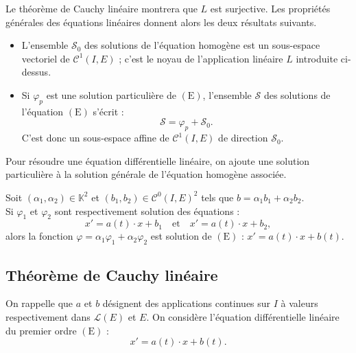\documentclass[french]{article}
\newcommand{\K}{\mathbb{K}}
\theoremstyle{plain}
\theoremstyle{definition}
\theoremstyle{remark}
\begin{document}
Le théorème de Cauchy linéaire montrera que $L$ est surjective. Les propriétés générales des équations linéaires donnent alors les deux résultats suivants.

\begin{prop}%
	\begin{itemize}
		\item L'ensemble $\mathcal{S}_0$ des solutions de l'équation homogène est un sous-espace vectoriel de $\mathcal{C}^1(I,E)$ ; c'est le noyau de l'application linéaire $L$ introduite ci-dessus.
		\item Si $\varphi_p$ est une solution particulière de $(\text{E})$, l'ensemble $\mathcal{S}$ des solutions de l'équation $(\text{E})$ s'écrit :
		$$\mathcal{S}=\varphi_p+\mathcal{S}_0.$$
		C'est donc un sous-espace affine de $\mathcal{C}^1(I,E)$ de direction $\mathcal{S}_0$.
	\end{itemize}
\end{prop}

\begin{met}
	Pour résoudre une équation différentielle linéaire, on ajoute une solution particulière à la solution générale de l'équation homogène associée.
\end{met}

\begin{prop}%
	Soit $(\alpha_1,\alpha_2)\in\K^2$ et $(b_1,b_2)\in\mathcal{C}^0(I,E)^2$ tels que $b=\alpha_1b_1+\alpha_2b_2$. \\
	Si $\varphi_1$ et $\varphi_2$ sont respectivement solution des équations :
	$$x'=a(t)\cdot x+b_1\quad\text{et}\quad x'=a(t)\cdot x+b_2,$$ alors la fonction $\varphi=\alpha_1\varphi_1+\alpha_2\varphi_2$ est solution de $(\text{E})$ : $x'=a(t)\cdot x+b(t)$.
\end{prop}

\subsection{Théorème de Cauchy linéaire}

On rappelle que $a$ et $b$ désignent des applications continues sur $I$ à valeurs respectivement dans $\mathcal{L}(E)$ et $E$. On considère l'équation différentielle linéaire du premier ordre $(\text{E})$ :
$$x'=a(t)\cdot x+b(t).$$
\end{document}

